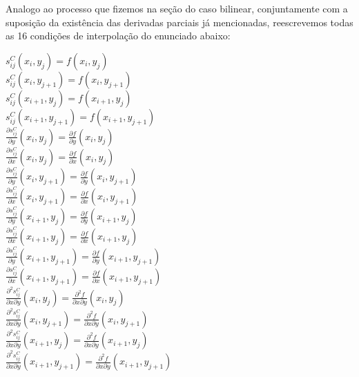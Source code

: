 \documentclass[11pt]{article}
\begin{document}
  Analogo ao processo que fizemos na seção do caso bilinear, conjuntamente com a suposição
  da existência das derivadas parciais já mencionadas, reescrevemos todas as 16 condições de
  interpolação do enunciado abaixo:

  \begin{center}
    $s_{ij}^C(x_i, y_j) = f(x_i, y_j)$ \\
    $s_{ij}^C(x_i, y_{j + 1}) = f(x_i, y_{j + 1})$ \\
    $s_{ij}^C(x_{i + 1}, y_j) = f(x_{i + 1}, y_j)$ \\
    $s_{ij}^C(x_{i + 1}, y_{j + 1}) = f(x_{i + 1}, y_{j + 1})$ \\
    $\frac{\partial s_{ij}^C}{\partial y}(x_i, y_j) = \frac{\partial f}{\partial y}(x_i, y_j)$ \\
    $\frac{\partial s_{ij}^C}{\partial x}(x_i, y_j) = \frac{\partial f}{\partial x}(x_i, y_j)$ \\
    $\frac{\partial s_{ij}^C}{\partial y}(x_i, y_{j + 1}) = \frac{\partial f}{\partial y}(x_i, y_{j + 1})$ \\
    $\frac{\partial s_{ij}^C}{\partial x}(x_i, y_{j + 1}) = \frac{\partial f}{\partial x}(x_i, y_{j + 1})$ \\
    $\frac{\partial s_{ij}^C}{\partial y}(x_{i + 1}, y_j) = \frac{\partial f}{\partial y}(x_{i + 1}, y_j)$ \\
    $\frac{\partial s_{ij}^C}{\partial x}(x_{i + 1}, y_j) = \frac{\partial f}{\partial x}(x_{i + 1}, y_j)$ \\
    $\frac{\partial s_{ij}^C}{\partial y}(x_{i + 1}, y_{j + 1}) = \frac{\partial f}{\partial y}(x_{i + 1}, y_{j + 1})$ \\
    $\frac{\partial s_{ij}^C}{\partial x}(x_{i + 1}, y_{j + 1}) = \frac{\partial f}{\partial x}(x_{i + 1}, y_{j + 1})$ \\
    $\frac{\partial^2 s_{ij}^C}{\partial x \partial y}(x_i, y_j) = \frac{\partial^2 f}{\partial x \partial y}(x_i, y_j)$ \\
    $\frac{\partial^2 s_{ij}^C}{\partial x \partial y}(x_i, y_{j + 1}) = \frac{\partial^2 f}{\partial x \partial y}(x_i, y_{j + 1})$ \\
    $\frac{\partial^2 s_{ij}^C}{\partial x \partial y}(x_{i + 1}, y_j) = \frac{\partial^2 f}{\partial x \partial y}(x_{i + 1}, y_j)$ \\
    $\frac{\partial^2 s_{ij}^C}{\partial x \partial y}(x_{i + 1}, y_{j + 1}) = \frac{\partial^2 f}{\partial x \partial y}(x_{i + 1}, y_{j + 1})$
  \end{center}
\end{document}
